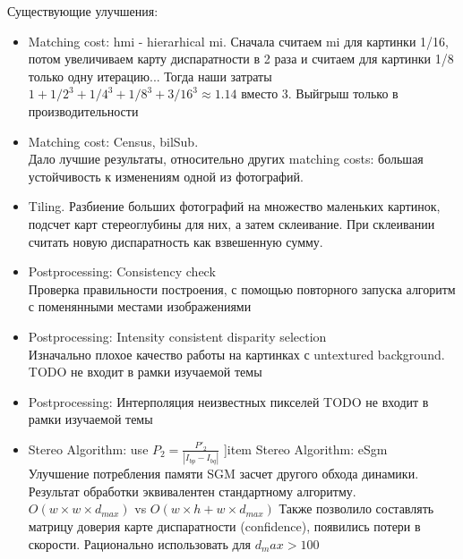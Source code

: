 \documentclass[14pt]{article} %
\begin{document}
Существующие улучшения:
\begin{itemize}
 \item Matching cost: hmi - hierarhical mi. Сначала считаем mi для картинки 1/16, потом увеличиваем карту диспаратности в 2 раза и считаем для картинки 1/8 только одну итерацию... Тогда наши затраты $1 +1/2^3 + 1/4^3 + 1/8^3 + 3 / 16^3  \approx 1.14$ вместо 3.  Выйгрыш только в производительности 
 \item Matching cost: Census, bilSub. \\ Дало лучшие результаты, относительно других matching costs: большая устойчивость к изменениям одной из фотографий.
 \item Tiling. Разбиение больших фотографий на множество маленьких картинок, подсчет карт стереоглубины для них, а затем склеивание. При склеивании считать новую диспаратность как взвешенную сумму.
 \item Postprocessing: Consistency check \\
 Проверка правильности построения, с помощью повторного запуска алгоритм с поменянными местами изображениями
\item Postprocessing: Intensity consistent disparity selection \\
 Изначально плохое качество работы на картинках с untextured background.  TODO не входит в рамки изучаемой темы
\item Postprocessing: Интерполяция неизвестных пикселей TODO не входит в рамки изучаемой темы
\item Stereo Algorithm: use $P_2 = \frac{P'_2}{|I_{bp} - I_{bq}|}$
]item Stereo Algorithm: eSgm \\
 Улучшение потребления памяти SGM засчет другого обхода динамики. Результат обработки эквивалентен стандартному алгоритму. $ O( w \times w \times d_{max})$ vs $O(w \times h + w \times d_{max}) $ Также позволило составлять матрицу доверия карте диспаратности (confidence), появились потери в скорости. Рационально использовать для $ d_max > 100 $ 
\end{itemize} 
\end{document}
